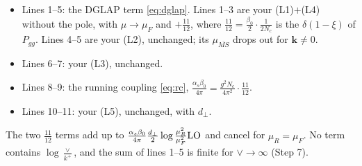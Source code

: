 \documentclass[10pt]{article}
\numberwithin{equation}{section}
\newcommand{\new}[1]{{\color{blue}#1}}
\newcommand{\LO}{{\rm LO}}
\begin{document}
\begin{itemize}
\item Lines 1--5: the DGLAP term \eqref{eq:dglap}. Lines 1--3 are your (L1)$+$(L4) without the pole, with $\mu\to\mu_F$ and \new{$+\frac{11}{12}$}, where $\frac{11}{12}=\frac{\beta_0}{2}\cdot\frac{1}{2N_c}$ is the $\delta(1-\xi)$ of $P_{gg}$. Lines 4--5 are your (L2), unchanged; its $\mu_{\overline{MS}}$ drops out for $\mathbf k\neq0$.
\item Lines 6--7: your (L3), unchanged.
\item Lines 8--9: the running coupling \eqref{eq:rc}, $\frac{\alpha_s\beta_0}{4\pi}=\frac{g^2N_c}{4\pi^2}\cdot\frac{11}{12}$.
\item Lines 10--11: your (L5), unchanged, with $d_\perp$.
\end{itemize}
The two \new{$\frac{11}{12}$} terms add up to $\frac{\alpha_s\beta_0}{4\pi}\frac{d_\perp}{2}\log\frac{\mu_R^2}{\mu_F^2}\LO$ and cancel for $\mu_R=\mu_F$. No term contains $\log\frac{\vee}{k^+}$, and the sum of lines 1--5 is finite for $\vee\to\infty$ (Step 7).
\end{document}
